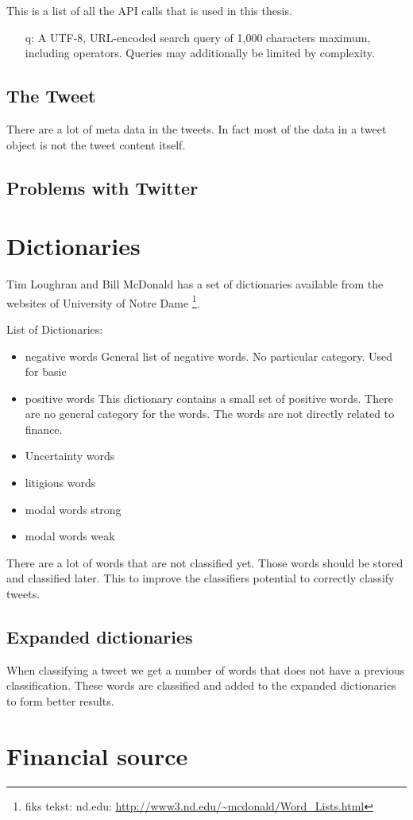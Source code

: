 This is a list of all the API calls that is used in this thesis. 
\begin{itemize}
\item[q:] A UTF-8, URL-encoded search query of 1,000 characters maximum, including
operators. Queries may additionally be limited by complexity.

\end{itemize}

\subsection{The Tweet}
There are a lot of meta data in the tweets. In fact most of the data in a tweet
object is not the tweet content itself. 

\subsection{Problems with Twitter}


\section{Dictionaries}\label{sec:dict}

Tim Loughran and Bill McDonald has a set of dictionaries available from the
websites of University of Notre Dame \footnote{fiks tekst: nd.edu:
\url{http://www3.nd.edu/~mcdonald/Word_Lists.html}}. 

List of Dictionaries:
\begin{itemize}
    \item negative words
General list of negative words. No particular category. Used for basic   
    \item positive words
This dictionary contains a small set of positive words. There are no general
category for the words. The words are not directly related to finance. 
    \item Uncertainty words
    \item litigious words
    \item modal words strong
    \item modal words weak
\end{itemize}

There are a lot of words that are not classified yet. Those words should be
stored and classified later. This to improve the classifiers potential to
correctly classify tweets.  

\subsection{Expanded dictionaries}
When classifying a tweet we get a number of words that does not have a previous
classification. These words are classified and added to the expanded
dictionaries to form better results. 


\section{Financial source}


